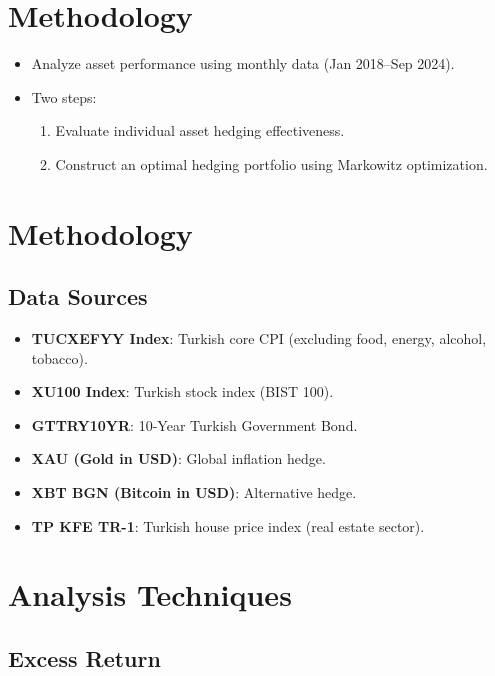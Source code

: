 \documentclass[
  11pt,
]{article}
\providecommand{\tightlist}{%
  \setlength{\itemsep}{0pt}\setlength{\parskip}{0pt}}
\begin{document}
\section{Methodology}\label{methodology}

\begin{itemize}
\tightlist
\item
  Analyze asset performance using monthly data (Jan 2018--Sep 2024).
\item
  Two steps:

  \begin{enumerate}
  \def\labelenumi{\arabic{enumi}.}
  \tightlist
  \item
    Evaluate individual asset hedging effectiveness.
  \item
    Construct an optimal hedging portfolio using Markowitz optimization.
  \end{enumerate}
\end{itemize}

\section{Methodology}\label{methodology-1}

\subsection{Data Sources}\label{data-sources}

\begin{itemize}
\tightlist
\item
  \textbf{TUCXEFYY Index}: Turkish core CPI (excluding food, energy,
  alcohol, tobacco).
\item
  \textbf{XU100 Index}: Turkish stock index (BIST 100).
\item
  \textbf{GTTRY10YR}: 10-Year Turkish Government Bond.
\item
  \textbf{XAU (Gold in USD)}: Global inflation hedge.
\item
  \textbf{XBT BGN (Bitcoin in USD)}: Alternative hedge.
\item
  \textbf{TP KFE TR-1}: Turkish house price index (real estate sector).
\end{itemize}

\section{Analysis Techniques}\label{analysis-techniques}

\subsection{Excess Return}\label{excess-return}
\end{document}
